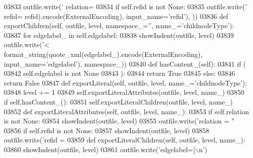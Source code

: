 \begin{DoxyCode}
{{{{{{{{{{{{{{{{{{{{{{{{{{{{{{{{{{{{{{{{{{{{{{{{{{{{{{{{{{{{{{{{{{{{{{{{{{{{{{{{{{{{{{{{{{{{{{{{{{{{{{{{{{{{{{{{{{{{{{{{{{{{{{{{{{{{{{{{{{{{{{{{{{{{{{{{{{{{{{{{{{{{{{{{{{{{{{{{{{{{{{{{{{{{{{{{{{{{{{{{{{{{{{{{{{{{{{{{{{{{{{{{{{{{{{{{{{{{{{{{{{{{{03833             outfile.write(\textcolor{stringliteral}{' relation=%
03834         \textcolor{keywordflow}{if} self.refid \textcolor{keywordflow}{is} \textcolor{keywordflow}{not} \textcolor{keywordtype}{None}:
03835             outfile.write(\textcolor{stringliteral}{' refid=%
      refid).encode(ExternalEncoding), input\_name=\textcolor{stringliteral}{'refid'}), ))
03836     \textcolor{keyword}{def }exportChildren(self, outfile, level, namespace\_='', name\_='childnodeType'):
03837         \textcolor{keywordflow}{for} edgelabel\_ \textcolor{keywordflow}{in} self.edgelabel:
03838             showIndent(outfile, level)
03839             outfile.write(\textcolor{stringliteral}{'<%
      format_string(quote_xml(edgelabel\_).encode(ExternalEncoding), input\_name=\textcolor{stringliteral}{'edgelabel'}), namespace\_))
03840     \textcolor{keyword}{def }hasContent_(self):
03841         \textcolor{keywordflow}{if} (
03842             self.edgelabel \textcolor{keywordflow}{is} \textcolor{keywordflow}{not} \textcolor{keywordtype}{None}
03843             ):
03844             \textcolor{keywordflow}{return} \textcolor{keyword}{True}
03845         \textcolor{keywordflow}{else}:
03846             \textcolor{keywordflow}{return} \textcolor{keyword}{False}
03847     \textcolor{keyword}{def }exportLiteral(self, outfile, level, name\_='childnodeType'):
03848         level += 1
03849         self.exportLiteralAttributes(outfile, level, name\_)
03850         \textcolor{keywordflow}{if} self.hasContent_():
03851             self.exportLiteralChildren(outfile, level, name\_)
03852     \textcolor{keyword}{def }exportLiteralAttributes(self, outfile, level, name\_):
03853         \textcolor{keywordflow}{if} self.relation \textcolor{keywordflow}{is} \textcolor{keywordflow}{not} \textcolor{keywordtype}{None}:
03854             showIndent(outfile, level)
03855             outfile.write(\textcolor{stringliteral}{'relation = "%
03856         \textcolor{keywordflow}{if} self.refid \textcolor{keywordflow}{is} \textcolor{keywordflow}{not} \textcolor{keywordtype}{None}:
03857             showIndent(outfile, level)
03858             outfile.write(\textcolor{stringliteral}{'refid = %
03859     \textcolor{keyword}{def }exportLiteralChildren(self, outfile, level, name\_):
03860         showIndent(outfile, level)
03861         outfile.write(\textcolor{stringliteral}{'edgelabel=[\(\backslash\)n'})
}}}}}}}}}}}}}}}}}}}}}}}}}}}}}}}}}}}}}}}}}}}}}}}}}}}}}}}}}}}}}}}}}}}}}}}}}}}}}}}}}}}}}}}}}}}}}}}}}}}}}}}}}}}}}}}}}}}}}}}}}}}}}}}}}}}}}}}}}}}}}}}}}}}}}}}}}}}}}}}}}}}}}}}}}}}}}}}}}}}}}}}}}}}}}}}}}}}}}}}}}}}}}}}}}}}}}}}}}}}}}}}}}}}}}}}}}}}}}}}}}}}}}}}}}}
\end{DoxyCode}
